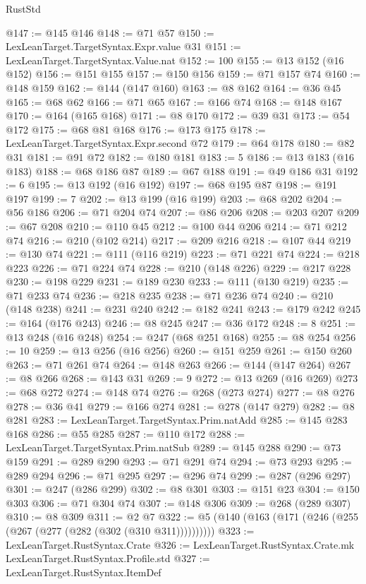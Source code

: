 \begin{lexlean}{RustStd}
\begin{coremodule}
@147 := @145 @146
@148 := @71 @57
@150 := LexLeanTarget.TargetSyntax.Expr.value @31
@151 := LexLeanTarget.TargetSyntax.Value.nat
@152 := 100
@155 := @13 @152 (@16 @152)
@156 := @151 @155
@157 := @150 @156
@159 := @71 @157 @74
@160 := @148 @159
@162 := @144 (@147 @160)
@163 := @8 @162
@164 := @36 @45
@165 := @68 @62
@166 := @71 @65
@167 := @166 @74
@168 := @148 @167
@170 := @164 (@165 @168)
@171 := @8 @170
@172 := @39 @31
@173 := @54 @172
@175 := @68 @81 @168
@176 := @173 @175
@178 := LexLeanTarget.TargetSyntax.Expr.second @72
@179 := @64 @178
@180 := @82 @31
@181 := @91 @72
@182 := @180 @181
@183 := 5
@186 := @13 @183 (@16 @183)
@188 := @68 @186 @87
@189 := @67 @188
@191 := @49 @186 @31
@192 := 6
@195 := @13 @192 (@16 @192)
@197 := @68 @195 @87
@198 := @191 @197
@199 := 7
@202 := @13 @199 (@16 @199)
@203 := @68 @202
@204 := @56 @186
@206 := @71 @204 @74
@207 := @86 @206
@208 := @203 @207
@209 := @67 @208
@210 := @110 @45
@212 := @100 @44 @206
@214 := @71 @212 @74
@216 := @210 (@102 @214)
@217 := @209 @216
@218 := @107 @44
@219 := @130 @74
@221 := @111 (@116 @219)
@223 := @71 @221 @74
@224 := @218 @223
@226 := @71 @224 @74
@228 := @210 (@148 @226)
@229 := @217 @228
@230 := @198 @229
@231 := @189 @230
@233 := @111 (@130 @219)
@235 := @71 @233 @74
@236 := @218 @235
@238 := @71 @236 @74
@240 := @210 (@148 @238)
@241 := @231 @240
@242 := @182 @241
@243 := @179 @242
@245 := @164 (@176 @243)
@246 := @8 @245
@247 := @36 @172
@248 := 8
@251 := @13 @248 (@16 @248)
@254 := @247 (@68 @251 @168)
@255 := @8 @254
@256 := 10
@259 := @13 @256 (@16 @256)
@260 := @151 @259
@261 := @150 @260
@263 := @71 @261 @74
@264 := @148 @263
@266 := @144 (@147 @264)
@267 := @8 @266
@268 := @143 @31
@269 := 9
@272 := @13 @269 (@16 @269)
@273 := @68 @272
@274 := @148 @74
@276 := @268 (@273 @274)
@277 := @8 @276
@278 := @36 @41
@279 := @166 @274
@281 := @278 (@147 @279)
@282 := @8 @281
@283 := LexLeanTarget.TargetSyntax.Prim.natAdd
@285 := @145 @283 @168
@286 := @55 @285
@287 := @110 @172
@288 := LexLeanTarget.TargetSyntax.Prim.natSub
@289 := @145 @288
@290 := @73 @159
@291 := @289 @290
@293 := @71 @291 @74
@294 := @73 @293
@295 := @289 @294
@296 := @71 @295
@297 := @296 @74
@299 := @287 (@296 @297)
@301 := @247 (@286 @299)
@302 := @8 @301
@303 := @151 @23
@304 := @150 @303
@306 := @71 @304 @74
@307 := @148 @306
@309 := @268 (@289 @307)
@310 := @8 @309
@311 := @2 @7
@322 := @5 (@140 (@163 (@171 (@246 (@255 (@267 (@277 (@282 (@302 (@310 @311))))))))))
@323 := LexLeanTarget.RustSyntax.Crate
@326 := LexLeanTarget.RustSyntax.Crate.mk LexLeanTarget.RustSyntax.Profile.std
@327 := LexLeanTarget.RustSyntax.ItemDef

\end{coremodule}
\end{lexlean}
